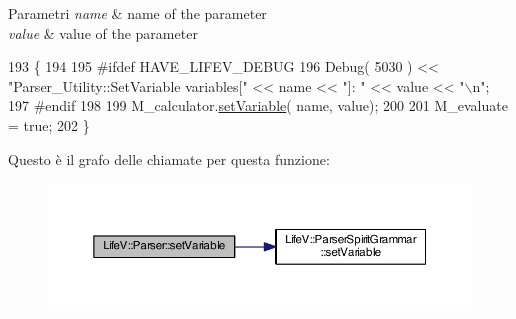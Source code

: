 \begin{DoxyParams}{Parametri}
{\em name} & name of the parameter \\
\hline
{\em value} & value of the parameter \\
\hline
\end{DoxyParams}

\begin{DoxyCode}
193 \{
194 
195 \textcolor{preprocessor}{#ifdef HAVE\_LIFEV\_DEBUG}
196 \textcolor{preprocessor}{}    Debug( 5030 ) << \textcolor{stringliteral}{"Parser\_Utility::SetVariable    variables["} << name << \textcolor{stringliteral}{"]: "} << value << \textcolor{stringliteral}{"\(\backslash\)n"};
197 \textcolor{preprocessor}{#endif}
198 \textcolor{preprocessor}{}
199     M\_calculator.\hyperlink{classLifeV_1_1ParserSpiritGrammar_a357a7e8d98940858ac6e05c106082e2e}{setVariable}( name, value);
200 
201     M\_evaluate = \textcolor{keyword}{true};
202 \}
\end{DoxyCode}


Questo è il grafo delle chiamate per questa funzione\-:\nopagebreak
\begin{figure}[H]
\begin{center}
\leavevmode
\includegraphics[width=350pt]{classLifeV_1_1Parser_aa2b362e12b8feb60231705d499c9fbae_cgraph}
\end{center}
\end{figure}




